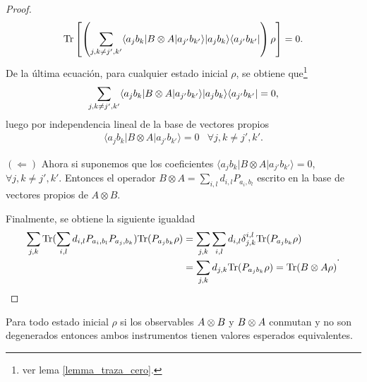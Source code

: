 \begin{proof}
\[\begin{split}
    {\rm Tr}\left[\left(\sum_{j,k\ne j',k'}  \langle a_j b_k |B\otimes A|a_{j'}b_{k'}\rangle |a_j b_k\rangle \langle a_{j'}b_{k'}|\right)\rho\right]&=0.\\
    \end{split}\]
    De la última ecuación, para cualquier estado inicial $\rho$, se obtiene que\footnote[1]{ver lema {\ref{lemma_traza_cero}}.} 
    \[\sum_{j,k\ne j', k'} \langle a_j b_k |B\otimes A|a_{j'}b_{k'}\rangle |a_j b_k\rangle \langle a_{j'}b_{k'}|=0,\] luego por independencia lineal de la base de vectores propios  
     \[\begin{array}{cc}
        \langle a_j b_k |B\otimes A|a_{j'}b_{k'}\rangle=0& \forall j,k\ne j',k'.\end{array}\]

        $(\Leftarrow)$
        Ahora si suponemos que los coeficientes  $\langle a_j b_k |B\otimes A|a_{j'}b_{k'}\rangle=0$,  $\forall j,k\ne j',k'$. Entonces el operador $B\otimes A=\sum_{i,l}d_{i,l}P_{a_i, b_l}$ escrito en la base de vectores propios de $A\otimes B$.
        
        Finalmente, se obtiene la siguiente igualdad \[\begin{split}\sum_{j,k}{\rm Tr}( \sum_{i,l}d_{i,l}P_{a_i, b_l} P_{a_j,b_k}){\rm Tr}(P_{a_j b_k}\rho )&=\sum_{j,k}\sum_{i,l}d_{i,l}\delta_{j,k}^{i,l}{\rm Tr}(P_{a_j b_k}\rho )\\&=\sum_{j,k}d_{j,k}{\rm Tr}(P_{a_j b_k}\rho )={\rm Tr}(B\otimes A\rho)\end{split}.\]


\end{proof}

\begin{corollary}
   Para todo estado inicial $\rho$ si los observables $A\otimes B$ y $B\otimes
A$ conmutan y  no son degenerados entonces ambos instrumentos tienen valores
esperados equivalentes.
\end{corollary}



